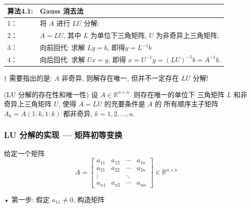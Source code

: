 \documentclass[12pt,a4paper]{article}
\begin{document}
\begin{table}  
	\begin{tabular*}{16cm}{ll}  
		\hline  
		算法4.1: & Gauss 消去法 \\  
		\hline  
		1：   &将 $A$ 进行 $LU$ 分解:\\  
		2：   &$A = LU$, 其中 $L$ 为单位下三角矩阵, $U$ 为非奇异上三角矩阵;\\
		3：   &向前回代: 求解 $Ly = b$, 即得$ y = L^{-1}b$\\
		4：   &向后回代: 求解 $Ux = y$, 即得 $x = U^{-1}y = (LU)^{-1}b = A^{-1}b$.\\  
		\hline  
	\end{tabular*}  
\end{table} 

 \begin{framed}
 	$†$ 需要指出的是: $A$ 非奇异, 则解存在唯一, 但并不一定存在 $LU$ 分解!
 \end{framed}

\begin{framed}
	\begin{theorem}(LU 分解的存在性和唯一性)
	设 $A ∈ \mathbb{R}^{n×n}$. 则存在唯一的单位下
	三角矩阵 $L$ 和非奇异上三角矩阵 $U$, 使得 $A = LU$ 的充要条件是 $A$ 的
	所有顺序主子矩阵 $A_k = A(1:k, 1:k)$ 都非奇异, $k = 1, 2, . . . , n.$	
	\end{theorem}
\end{framed}

\newpage
\subsubsection{LU 分解的实现 — 矩阵初等变换}
给定一个矩阵
\begin{equation*}
A=\left[\begin{array}{cccc}{a_{11}} & {a_{12}} & {\cdots} & {a_{1 n}} \\ {a_{21}} & {a_{22}} & {\cdots} & {a_{2 n}} \\ {\vdots} & {} & {\ddots} & {} \\ {a_{n 1}} & {a_{n 2}} & {\cdots} & {a_{n n}}\end{array}\right] \in \mathbb{R}^{n \times n}
\end{equation*}

• 第一步: 假定 $a_{11} \neq  0$, 构造矩阵
\end{document}
